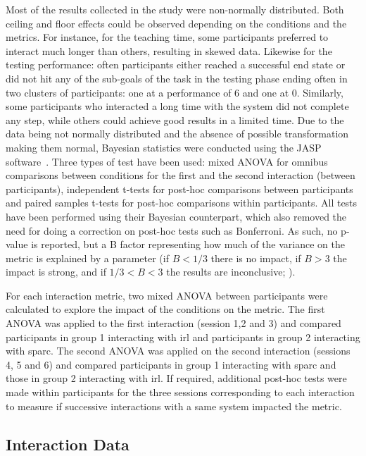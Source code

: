 Most of the results collected in the study were non-normally distributed. Both ceiling and floor effects could be observed depending on the conditions and the metrics. For instance, for the teaching time, some participants preferred to interact much longer than others, resulting in skewed data. Likewise for the testing performance: often participants either reached a successful end state or did not hit any of the sub-goals of the task in the testing phase ending often in two clusters of participants: one at a performance of 6 and one at 0.  Similarly, some participants who interacted a long time with the system did not complete any step, while others could achieve good results in a limited time. Due to the data being not normally distributed and the absence of possible transformation making them normal, Bayesian statistics were conducted using the JASP software~\citep{jasp2018}. Three types of test have been used: mixed ANOVA for omnibus comparisons between conditions for the first and the second interaction (between participants), independent t-tests for post-hoc comparisons between participants and paired samples t-tests for post-hoc comparisons within participants. All tests have been performed using their Bayesian counterpart, which also removed the need for doing a correction on post-hoc tests such as Bonferroni. As such, no p-value is reported, but a B factor representing how much of the variance on the metric is explained by a parameter (if $B < 1/3$ there is no impact, if $B > 3$ the impact is strong, and if $1/3<B<3$ the results are inconclusive; \citealt{jeffreys1998theory,dienes2011bayesian}).

For each interaction metric, two mixed ANOVA between participants were calculated to explore the impact of the conditions on the metric. The first ANOVA was applied to the first interaction (session 1,2 and 3) and compared participants in group 1 interacting with \gls{irl} and participants in group 2 interacting with \gls{sparc}. The second ANOVA was applied on the second interaction (sessions 4, 5 and 6) and compared participants in group 1 interacting with \gls{sparc} and those in group 2 interacting with \gls{irl}. If required, additional post-hoc tests were made within participants for the three sessions corresponding to each interaction to measure if successive interactions with a same system impacted the metric.

\subsection{Interaction Data}

